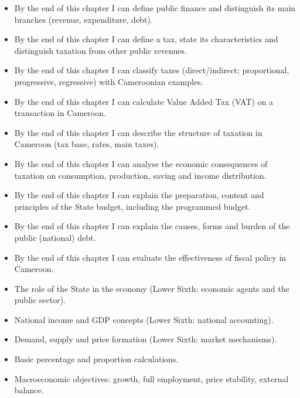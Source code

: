 \documentclass[11pt]{article}
\begin{document}
\begin{objectifs}
\begin{itemize}
\item By the end of this chapter I can define public finance and distinguish its main branches (revenue, expenditure, debt).
\item By the end of this chapter I can define a tax, state its characteristics and distinguish taxation from other public revenues.
\item By the end of this chapter I can classify taxes (direct/indirect; proportional, progressive, regressive) with Cameroonian examples.
\item By the end of this chapter I can calculate Value Added Tax (VAT) on a transaction in Cameroon.
\item By the end of this chapter I can describe the structure of taxation in Cameroon (tax base, rates, main taxes).
\item By the end of this chapter I can analyse the economic consequences of taxation on consumption, production, saving and income distribution.
\item By the end of this chapter I can explain the preparation, content and principles of the State budget, including the programmed budget.
\item By the end of this chapter I can explain the causes, forms and burden of the public (national) debt.
\item By the end of this chapter I can evaluate the effectiveness of fiscal policy in Cameroon.
\end{itemize}
\end{objectifs}

\begin{prerequis}
\begin{itemize}
\item The role of the State in the economy (Lower Sixth: economic agents and the public sector).
\item National income and GDP concepts (Lower Sixth: national accounting).
\item Demand, supply and price formation (Lower Sixth: market mechanisms).
\item Basic percentage and proportion calculations.
\item Macroeconomic objectives: growth, full employment, price stability, external balance.
\end{itemize}
\end{prerequis}

\newpage
\end{document}
